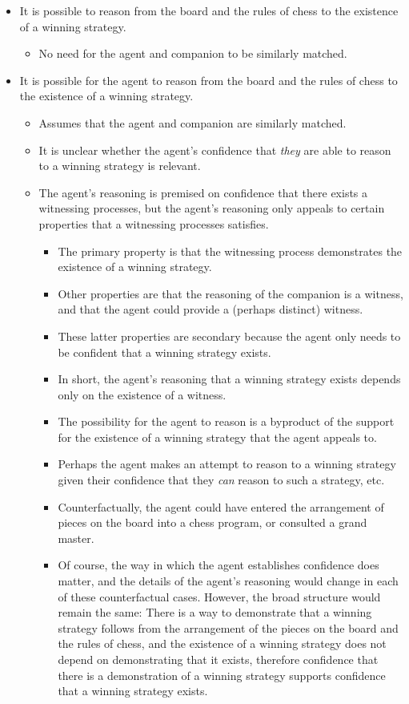 \documentclass[10pt]{article}
\begin{document}
\begin{itemize}
\item It is possible to reason from the board and the rules of chess to the existence of a winning strategy.
  \begin{itemize}
  \item No need for the agent and companion to be similarly matched.
  \end{itemize}
\item It is possible for the agent to reason from the board and the rules of chess to the existence of a winning strategy.
  \begin{itemize}
  \item Assumes that the agent and companion are similarly matched.
  \item It is unclear whether the agent's confidence that \emph{they} are able to reason to a winning strategy is relevant.
  \item The agent's reasoning is premised on confidence that there exists a witnessing processes, but the agent's reasoning only appeals to certain properties that a witnessing processes satisfies.
    \begin{itemize}
    \item The primary property is that the witnessing process demonstrates the existence of a winning strategy.
    \item Other properties are that the reasoning of the companion is a witness, and that the agent could provide a (perhaps distinct) witness.
    \item These latter properties are secondary because the agent only needs to be confident that a winning strategy exists.
    \item In short, the agent's reasoning that a winning strategy exists depends only on the existence of a witness.
    \item The possibility for the agent to reason is a byproduct of the support for the existence of a winning strategy that the agent appeals to.
  \item Perhaps the agent makes an attempt to reason to a winning strategy given their confidence that they \emph{can} reason to such a strategy, etc.
  \item Counterfactually, the agent could have entered the arrangement of pieces on the board into a chess program, or consulted a grand master.
  \item Of course, the way in which the agent establishes confidence does matter, and the details of the agent's reasoning would change in each of these counterfactual cases.
    However, the broad structure would remain the same: There is a way to demonstrate that a winning strategy follows from the arrangement of the pieces on the board and the rules of chess, and the existence of a winning strategy does not depend on demonstrating that it exists, therefore confidence that there is a demonstration of a winning strategy supports confidence that a winning strategy exists.
    \end{itemize}
  \end{itemize}
\end{itemize}
\end{document}
